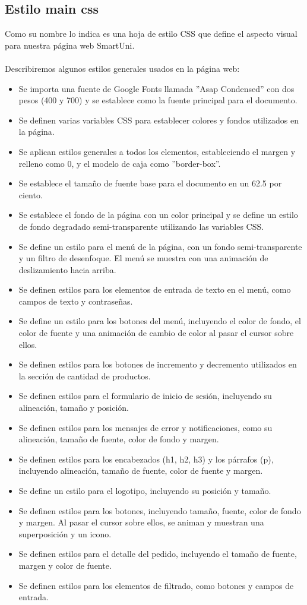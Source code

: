 \documentclass[12pt]{report}
\begin{document}
\subsection{Estilo main css}
Como su nombre lo indica es una hoja de estilo CSS que define el aspecto visual para nuestra página web SmartUni.
\\\\Describiremos algunos estilos generales usados en la página web:\\
\begin{itemize}
    \item Se importa una fuente de Google Fonts llamada ''Asap Condensed'' con dos pesos (400 y 700) y se establece como la fuente principal para el documento.
    \item Se definen varias variables CSS para establecer colores y fondos utilizados en la página.
    \item Se aplican estilos generales a todos los elementos, estableciendo el margen y relleno como 0, y el modelo de caja como ''border-box''. 
    \item Se establece el tamaño de fuente base para el documento en un 62.5 por ciento.
    \item Se establece el fondo de la página con un color principal y se define un estilo de fondo degradado semi-transparente utilizando las variables CSS.
    \item Se define un estilo para el menú de la página, con un fondo semi-transparente y un filtro de desenfoque. El menú se muestra con una animación de deslizamiento hacia arriba.
    \item Se definen estilos para los elementos de entrada de texto en el menú, como campos de texto y contraseñas.
    \item Se define un estilo para los botones del menú, incluyendo el color de fondo, el color de fuente y una animación de cambio de color al pasar el cursor sobre ellos.
    \item Se definen estilos para los botones de incremento y decremento utilizados en la sección de cantidad de productos.
    \item Se definen estilos para el formulario de inicio de sesión, incluyendo su alineación, tamaño y posición.
    \item Se definen estilos para los mensajes de error y notificaciones, como su alineación, tamaño de fuente, color de fondo y margen.
    \item Se definen estilos para los encabezados (h1, h2, h3) y los párrafos (p), incluyendo alineación, tamaño de fuente, color de fuente y margen.
    \item Se define un estilo para el logotipo, incluyendo su posición y tamaño.
    \item Se definen estilos para los botones, incluyendo tamaño, fuente, color de fondo y margen. Al pasar el cursor sobre ellos, se animan y muestran una superposición y un icono.
    \item Se definen estilos para el detalle del pedido, incluyendo el tamaño de fuente, margen y color de fuente.
    \item Se definen estilos para los elementos de filtrado, como botones y campos de entrada.
\end{itemize}
\end{document}

